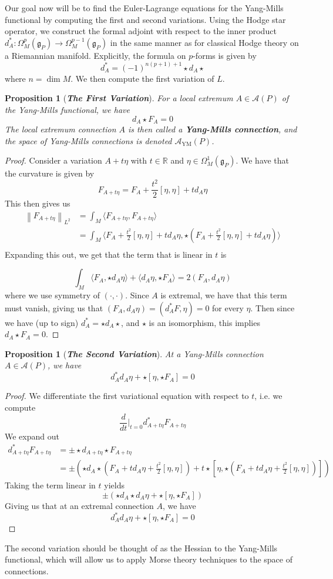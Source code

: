 \documentclass[psamsfonts, 12pt]{amsart}
\newtheorem{prop}[thm]{Proposition}
\theoremstyle{definition}
\theoremstyle{remark}
\newcommand{\R}{\mathbb{R}}
\newcommand{\ib}[1]{\textbf{\textit{#1}}}
\newcommand{\g}{\mathfrak{g}}
\newcommand{\norm}[1]{\left\lVert#1\right\rVert}
\begin{document}
Our goal now will be to find the Euler-Lagrange
equations for the Yang-Mills functional by computing the first and second variations.
Using the Hodge star operator, we construct the formal adjoint with respect to
the inner product $d_A^* : \Omega^{p}_M(\g_P) \to \Omega^{p-1}_M(\g_P)$ in the same manner
as for classical Hodge theory on a Riemannian manifold. Explicitly, the formula
on $p$-forms is given by
\[
d^*_A = (-1)^{n(p+1) + 1}\star d_A \star
\]
where $n = \dim M$. We then compute the first variation of $L$.
%
\begin{prop}[\ib{The First Variation}]
For a local extremum $A \in \mathscr{A}(P)$ of the Yang-Mills functional, we have
\[
d_A\star F_A = 0
\]
The local extremum connection $A$ is then called a \ib{Yang-Mills connection}, and the
space of Yang-Mills connections is denoted $\mathscr{A}_{\mathrm{YM}}(P)$.
\end{prop}
%
\begin{proof}
Consider a variation $A + t\eta$ with $t \in \R$ and $\eta \in \Omega^1_M(\g_P)$.
We have that the curvature is given by
\[
F_{A+t\eta} = F_A + \frac{t^2}{2}[\eta,\eta] + td_A\eta
\]
This then gives us
\begin{align*}
\norm{F_{A+t\eta}}_{L^2} &= \int_M \langle F_{A+t\eta},F_{A+t\eta}\rangle \\
&= \int_M \langle F_A + \frac{t^2}{2}[\eta,\eta]
+ td_A\eta,\star (F_A + \frac{t^2}{2}[\eta,\eta] + td_A\eta)\rangle \\
\end{align*}
Expanding this out, we get that the term that is linear in $t$ is

\[
\int_M \langle F_A, \star d_A\eta\rangle + \langle d_A\eta, \star F_A \rangle
= 2(F_A,d_A\eta)
\]
where we use symmetry of $(\cdot,\cdot)$. Since $A$ is extremal, we have that
this term must vanish, giving us that $(F_A,d_A\eta) = (d^*_A F,\eta) = 0$ for
every $\eta$. Then since we have (up to sign) $d^*_A = \star d_A \star$, and
$\star$ is an isomorphism, this implies $d_A\star F_A = 0$.
\end{proof}
%
\begin{prop}[\ib{The Second Variation}]
At a Yang-Mills connection $A \in \mathscr{A}(P)$, we have
\[
d^*_A d_A\eta + \star[\eta,\star F_A] = 0
\]
\end{prop}
%
\begin{proof}
We differentiate the first variational equation with respect to $t$, i.e.
we compute
\[
\frac{d}{dt}\bigg\vert_{t=0} d_{A+t\eta}^*F_{A+t\eta}
\]
We expand out
\begin{align*}
d_{A+t\eta}^*F_{A+t\eta} &= \pm \star d_{A+t\eta}\star F_{A+t\eta} \\
&= \pm\left(\star d_A\star\left(F_A + td_A\eta + \frac{t^2}{2}[\eta,\eta]\right)
+ t\star
\left[\eta, \star\left(F_A + td_A\eta + \frac{t^2}{2}[\eta,\eta]\right)\right]\right)
\end{align*}
Taking the term linear in $t$ yields
\[
\pm\left( \star d_A\star d_A\eta + \star[\eta,\star F_A] \right)
\]
Giving us that at an extremal connection $A$, we have
\[
d^*_A d_A\eta + \star[\eta,\star F_A] = 0
\]
\end{proof}
%
The second variation should be thought of as the Hessian to the Yang-Mills functional,
which will allow us to apply Morse theory techniques to the space of connections.
%
\end{document}
